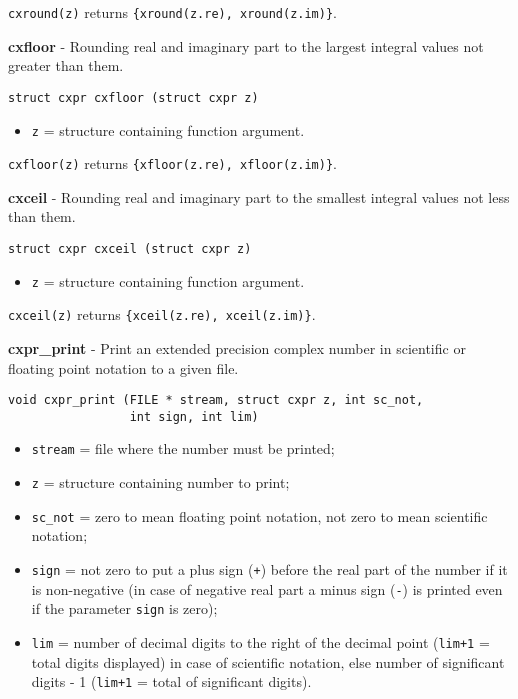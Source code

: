 \documentclass{article}
\begin{document}
\texttt{cxround(z)} returns \texttt{\{xround(z.re), xround(z.im)\}}.


\hrulefill{}

\textbf{cxfloor} - Rounding real and imaginary part
to the largest integral values not greater than them. 

\begin{verbatim}
struct cxpr cxfloor (struct cxpr z)
\end{verbatim}

\begin{itemize}
\item \texttt{z} = structure containing function argument.
\end{itemize}

\texttt{cxfloor(z)} returns \texttt{\{xfloor(z.re), xfloor(z.im)\}}.


\hrulefill{}

\textbf{cxceil} - Rounding real and imaginary part
to the smallest integral values not less than them.

\begin{verbatim}
struct cxpr cxceil (struct cxpr z)
\end{verbatim}

\begin{itemize}
\item \texttt{z} = structure containing function argument.
\end{itemize}

\texttt{cxceil(z)} returns \texttt{\{xceil(z.re), xceil(z.im)\}}.


\hrulefill{}

\textbf{cxpr\_print} - Print an extended precision complex number 
in scientific or floating point notation to a given file.

\begin{verbatim}
void cxpr_print (FILE * stream, struct cxpr z, int sc_not,
                 int sign, int lim)
\end{verbatim}

\begin{itemize}
\item \texttt{stream} = file where the number must be printed;
\item \texttt{z} = structure containing number to print;
\item \texttt{sc\_not} = zero to mean floating point notation, not zero to mean scientific notation;
\item \texttt{sign}   = not zero to put a plus sign (\texttt{+}) before the real part 
of the number if it is non-negative (in case of negative real part 
a minus sign (\texttt{-}) is printed even if the parameter \texttt{sign} is zero);
\item \texttt{lim}    = number of decimal digits to the right of the
decimal point (\texttt{lim+1} = total digits displayed) in
case of scientific notation, else number of significant digits - 1
(\texttt{lim+1} = total of significant digits).
\end{itemize}
\end{document}
